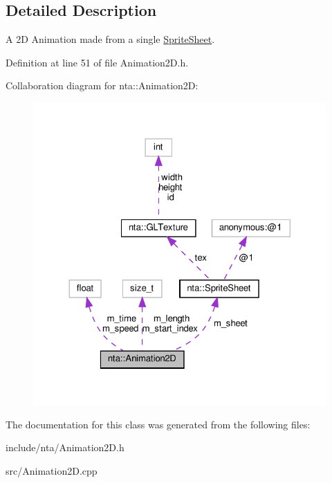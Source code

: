 \subsection{Detailed Description}
A 2D Animation made from a single \hyperlink{structnta_1_1SpriteSheet}{Sprite\+Sheet}. 

Definition at line 51 of file Animation2\+D.\+h.



Collaboration diagram for nta\+:\+:Animation2D\+:\nopagebreak
\begin{figure}[H]
\begin{center}
\leavevmode
\includegraphics[width=324pt]{db/d21/classnta_1_1Animation2D__coll__graph}
\end{center}
\end{figure}


The documentation for this class was generated from the following files\+:\begin{DoxyCompactItemize}
\item 
include/nta/Animation2\+D.\+h\item 
src/Animation2\+D.\+cpp\end{DoxyCompactItemize}
